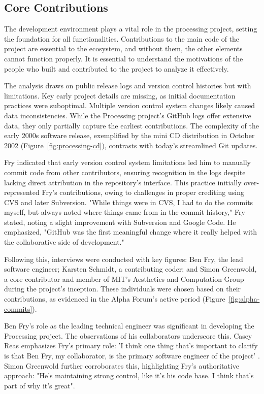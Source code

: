 \subsection{Core Contributions}
The development environment plays a vital role in the processing project, setting the foundation for all functionalities. Contributions to the main code of the project are essential to the ecosystem, and without them, the other elements cannot function properly. It is essential to understand the motivations of the people who built and contributed to the project to analyze it effectively.

The analysis draws on public release logs and version control histories but with limitations. Key early project details are missing, as initial documentation practices were suboptimal. Multiple version control system changes likely caused data inconsistencies. While the Processing project's GitHub logs offer extensive data, they only partially capture the earliest contributions. The complexity of the early 2000s software release, exemplified by the mini CD distribution in October 2002 (Figure~\ref{fig:processing-cd}), contrasts with today's streamlined Git updates.

Fry indicated that early version control system limitations led him to manually commit code from other contributors, ensuring recognition in the logs despite lacking direct attribution in the repository's interface. This practice initially over-represented Fry's contributions, owing to challenges in proper crediting using CVS and later Subversion. "While things were in CVS, I had to do the commits myself, but always noted where things came from in the commit history," Fry stated, noting a slight improvement with Subversion and Google Code. He emphasized, "GitHub was the first meaningful change where it really helped with the collaborative side of development."

Following this, interviews were conducted with key figures: Ben Fry, the lead software engineer; Karsten Schmidt, a contributing coder; and Simon Greenwold, a core contributor and member of MIT's Aesthetics and Computation Group during the project's inception. These individuals were chosen based on their contributions, as evidenced in the Alpha Forum's active period (Figure~\ref{fig:alpha-commits}).

Ben Fry's role as the leading technical engineer was significant in developing the Processing project. The observations of his collaborators underscore this. Casey Reas emphasizes Fry's primary role: 'I think one thing that's important to clarify is that Ben Fry, my collaborator, is the primary software engineer of the project' \parencite[p. 330]{conradGraphicDesignPostdigital2021}. Simon Greenwold further corroborates this, highlighting Fry's authoritative approach: "He's maintaining strong control, like it's his code base. I think that's part of why it's great".

